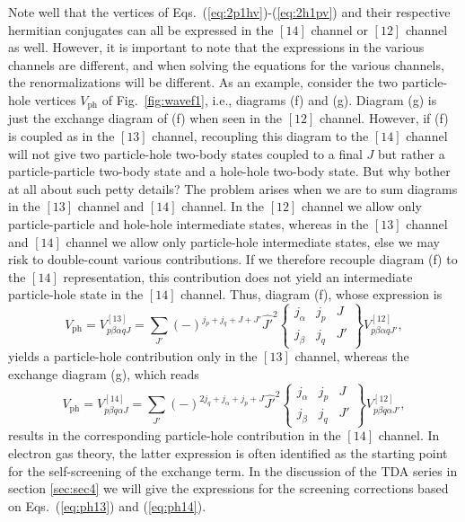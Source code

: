 Note well that the vertices of Eqs.\ (\ref{eq:2p1hv})-(\ref{eq:2h1pv})
and their respective 
hermitian conjugates can all be expressed in the $[14]$ channel
or $[12]$ channel as well.
However, it is important to note that the expressions in the various
channels are different, and when solving the equations for the various 
channels, the renormalizations will be different. As an example, consider
the two particle-hole vertices $V_{\mathrm{ph}}$ 
of Fig.\ \ref{fig:wavef1}, i.e., diagrams (f) and (g).
Diagram (g) is just the exchange diagram of (f) when seen in the 
$[12]$ channel. However, if (f) is coupled as in the $[13]$ channel,
recoupling this diagram to the $[14]$ channel will not give 
two particle-hole
two-body states coupled to a final $J$ but rather 
a particle-particle two-body state and a hole-hole  two-body state.
But why bother at all about such petty details? The problem arises when we 
are to  sum diagrams in the $[13]$ channel and $[14]$ channel.  
In the $[12]$ channel we allow only particle-particle and hole-hole
intermediate states, whereas in the $[13]$ channel and $[14]$ channel
we allow only particle-hole intermediate states, else we may risk
to double-count various contributions. 
If we therefore recouple
diagram (f) to the $[14]$ representation, this contribution
does not yield an intermediate particle-hole state
in the $[14]$ channel.
Thus, diagram (f), whose expression is 
\begin{equation}
      V_{\mathrm{ph}}=V_{p\beta \alpha q J}^{[13]}=
      {\displaystyle \sum_{J'}}(-)^{j_p+j_q+J+J'}\hat{J'}^2
      \left\{
      \begin{array}{ccc}
       j_{\alpha}&j_p&J\\j_{\beta}&j_q&J'
      \end{array}
       \right\}
       V_{p\beta \alpha q J'}^{[12]},
       \label{eq:ph13}
\end{equation}
yields a particle-hole contribution only in the $[13]$ channel,
whereas the exchange diagram (g), which reads
\begin{equation}
      V_{\mathrm{ph}}=V_{p\beta q\alpha J}^{[14]}=
      {\displaystyle \sum_{J'}}(-)^{2j_q+j_{\alpha}+j_p+J}\hat{J'}^2
      \left\{
      \begin{array}{ccc}
       j_{\alpha}&j_p&J\\j_{\beta}&j_{q}&J'
      \end{array}
       \right\}
       V_{p\beta q\alpha J'}^{[12]},
       \label{eq:ph14}
\end{equation}
results in the corresponding particle-hole contribution in the 
$[14]$ channel.
In electron gas theory, the latter expression 
is often identified as the starting point for the self-screening
of the exchange term. In the discussion of the TDA series in 
section \ref{sec:sec4} we will give the expressions for the screening
corrections based on Eqs.\ (\ref{eq:ph13}) and (\ref{eq:ph14}). 

